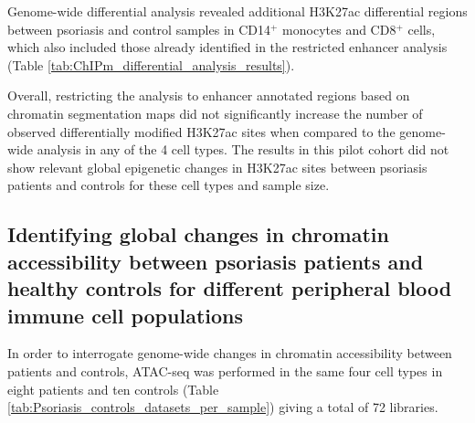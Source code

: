 Genome-wide differential analysis revealed additional H3K27ac differential regions between psoriasis and control samples in CD14$^+$ monocytes and CD8$^+$ cells, which also included those already identified in the restricted enhancer analysis (Table \ref{tab:ChIPm_differential_analysis_results}). 

Overall, restricting the analysis to enhancer annotated regions based on chromatin segmentation maps did not significantly increase the number of observed differentially modified H3K27ac sites when compared to the genome-wide analysis in any of the 4 cell types. The results in this pilot cohort did not show relevant global epigenetic changes in H3K27ac sites between psoriasis patients and controls for these cell types and sample size.


\subsection{Identifying global changes in chromatin accessibility between psoriasis patients and healthy controls for different peripheral blood immune cell populations}

In order to interrogate genome-wide changes in chromatin accessibility between patients and controls, ATAC-seq was performed in the same four cell types in eight patients and ten controls (Table \ref{tab:Psoriasis_controls_datasets_per_sample}) giving a total of 72 libraries.


